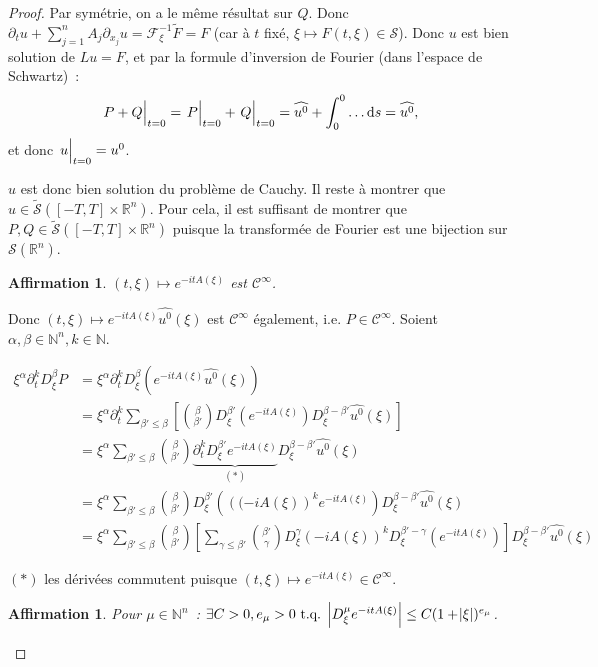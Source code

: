 \documentclass{report}
\newcommand{\R}{{\mathbb R}}
\newcommand{\N}{{\mathbb N}}
\newcommand{\tq}{\text{ t.q. }}
\newcommand{\st}{\tq}
\newcommand{\restr}[2]{\left.#1\vphantom{\big|}\right|_{#2}}
\newtheorem{claim}[thm]{Affirmation}
\theoremstyle{definition}
\theoremstyle{remark}
\begin{document}
\begin{proof}
Par symétrie, on a le même résultat sur $Q$. Donc $\partial_t u + \sum_{j=1}^nA_j\partial_{x_j}u = \mathcal F_\xi^{-1}\widetilde F = F$
(car à $t$ fixé, $\xi \mapsto F(t, \xi) \in \mathcal S$). Donc $u$ est bien solution de $Lu = F$, et par la formule d'inversion de Fourier (dans l'espace de Schwartz)~:
\[\restr {P+Q}{t=0} = \restr P{t=0} + \restr Q{t=0} = \widehat {u^0} + \int_0^0\ldots\dif s = \widehat {u^0},\]
et donc $\restr u{t=0} = u^0$.

$u$ est donc bien solution du problème de Cauchy. Il reste à montrer que $u \in \widetilde {\mathcal S}([-T, T] \times \R^n)$. Pour cela, il est suffisant de montrer que
$P, Q \in \widetilde {\mathcal S}([-T, T] \times \R^n)$ puisque la transformée de Fourier est une bijection sur $\mathcal S(\R^n)$.

\begin{claim}\label{claim 2} $(t, \xi) \mapsto e^{-itA(\xi)}$ est $\mathcal C^\infty$.
\end{claim}

Donc $(t, \xi) \mapsto e^{-itA(\xi)}\widehat {u^0}(\xi)$ est $\mathcal C^\infty$ également, i.e. $P \in \mathcal C^\infty$.
Soient $\alpha, \beta \in \N^n, k \in \N$.

\begin{align*}
	\xi^\alpha\partial_t^kD_\xi^\beta P
	&= \xi^\alpha\partial_t^kD_\xi^\beta\left(e^{-itA(\xi)}\widehat {u^0}(\xi)\right) \\
	&= \xi^\alpha\partial_t^k\sum_{\beta'\leq\beta}\left[\binom \beta{\beta'}D_\xi^{\beta'}(e^{-itA(\xi)})D_\xi^{\beta-\beta'}\widehat {u^0}(\xi)\right] \\
	&= \xi^\alpha\sum_{\beta'\leq\beta}\binom\beta{\beta'}\underbrace {\partial_t^kD_\xi^{\beta'}e^{-itA(\xi)}}_{(*)}D_\xi^{\beta-\beta'}\widehat {u^0}(\xi) \\
	&= \xi^\alpha\sum_{\beta'\leq\beta}\binom\beta{\beta'}D_\xi^{\beta'}\left(\left((-iA(\xi)\right)^ke^{-itA(\xi)}\right)D_\xi^{\beta-\beta'}\widehat {u^0}(\xi) \\
	&= \xi^\alpha\sum_{\beta'\leq\beta}\binom \beta{\beta'}\left[\sum_{\gamma\leq\beta'}\binom{\beta'}\gamma D_\xi^\gamma\left(-iA(\xi)\right)^kD_\xi^{\beta'-\gamma}\left(e^{-itA(\xi)}\right)\right]D_\xi^{\beta-\beta'}\widehat{u^0}(\xi)
\end{align*}

{\tiny {$(*)$ les dérivées commutent puisque $(t, \xi) \mapsto e^{-itA(\xi)} \in \mathcal C^\infty$.}}

\begin{claim}\label{claim 3} Pour $\mu \in \N^n$~: $\exists C > 0, e_\mu > 0 \st \abs {D_\xi^\mu e^{-itA(\xi)}} \leq C(1+\abs\xi)^{e_\mu}$.
\end{claim}


\end{proof}
\end{document}

